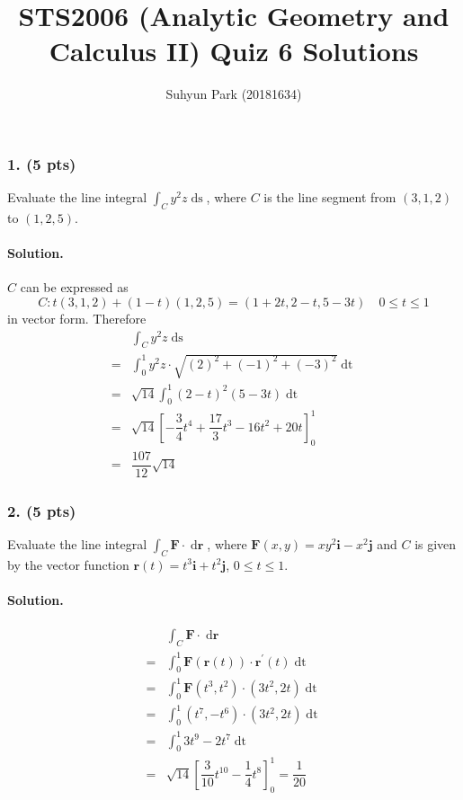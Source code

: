\documentclass[runningheads]{llncs}
\begin{document}
\title{STS2006 (Analytic Geometry and Calculus II) \newline Quiz 6 Solutions}
\author{Suhyun Park (20181634)}
\maketitle

\subsubsection{1. (5 pts)} Evaluate the line integral $\int_C y^2z \mathop{ds}$, where $C$ is the line segment from $\left(3, 1, 2\right)$ to $\left(1, 2, 5\right)$.

\paragraph{Solution.} $C$ can be expressed as
\[C: t\left(3, 1, 2\right) + \left(1-t\right)\left(1, 2, 5\right)=\left(1+2t, 2-t, 5-3t\right) \quad 0\leq t\leq1\]
in vector form. Therefore
\begin{align*}
	& \int_C y^2z \mathop{ds}\\
	=& \int_0^1 y^2z\cdot\sqrt{\left(2\right)^2+\left(-1\right)^2+\left(-3\right)^2}\mathop{dt}\\
	=& \sqrt{14}\int_0^1 \left(2-t\right)^2\left(5-3t\right)\mathop{dt}\\
	=& \sqrt{14}\left[-\dfrac{3}{4}t^4+\dfrac{17}{3}t^3-16t^2+20t\right]_0^1\\
	=& \dfrac{107}{12}\sqrt{14}
\end{align*}
\par

\subsubsection{2. (5 pts)} Evaluate the line integral $\int_C \mathbf{F}\cdot\mathop{d\mathbf{r}}$, where $\mathbf{F}\left(x, y\right)=xy^2\mathbf{i}-x^2\mathbf{j}$ and $C$ is given by the vector function $\mathbf{r}\left(t\right)=t^3\mathbf{i}+t^2\mathbf{j}$, $0\leq t\leq1$.

\paragraph{Solution.}

\begin{align*}
	& \int_C \mathbf{F}\cdot\mathop{d\mathbf{r}}\\
	=& \int_0^1 \mathbf{F}\left(\mathbf{r}\left(t\right)\right)\cdot\mathbf{r}^\prime\left(t\right)\mathop{dt}\\
	=& \int_0^1 \mathbf{F}\left(t^3, t^2\right)\cdot\left(3t^2, 2t\right)\mathop{dt}\\
	=& \int_0^1 \left(t^7, -t^6\right)\cdot\left(3t^2, 2t\right)\mathop{dt}\\
	=& \int_0^1 3t^9-2t^7\mathop{dt}\\
	=& \sqrt{14}\left[\dfrac{3}{10}t^{10}-\dfrac{1}{4}t^8\right]_0^1 = \dfrac{1}{20}
\end{align*}
\end{document}
